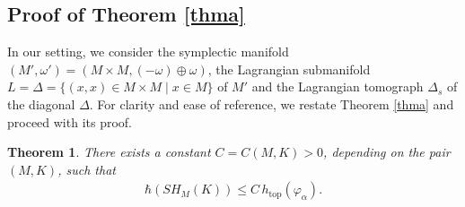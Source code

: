 \documentclass[12pt]{amsart}
\newtheorem{theorem}{Theorem}[section]
\theoremstyle{definition}
\begin{document}
\subsection{Proof of Theorem \ref{thma}}
In our setting, we consider the symplectic manifold $(M', \omega') = ( M \times M,(-\omega)\oplus \omega)$, the Lagrangian submanifold $L = \Delta=\{(x,x) \in M \times M \mid x\in M\}$ of $M'$ and the Lagrangian tomograph $\Delta_s$ of the diagonal $\Delta$. For clarity and ease of reference, we restate Theorem \ref{thma} and proceed with its proof.
\begin{theorem}\label{thmare}
    There exists a constant $C=C(M,K) >0$, depending on the pair $(M,K)$, such that
    \begin{align*}
     \hbar (SH_M(K))\leq C\, h_{\textrm{top}}(\varphi_\alpha).
    \end{align*}
 \end{theorem}
\end{document}
